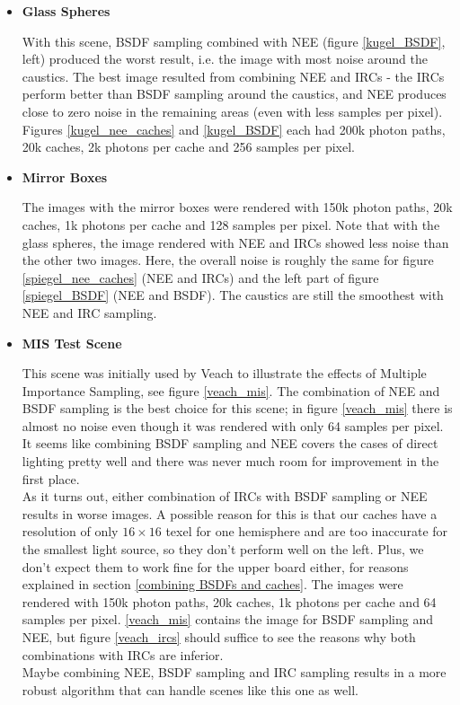 \begin{itemize}
\item \textbf{Glass Spheres}

With this scene, BSDF sampling combined with NEE (figure \ref{kugel_BSDF}, left) produced the worst result, i.e. the image with most noise around the caustics. The best image resulted from combining NEE and IRCs - the IRCs perform better than BSDF sampling around the caustics, and NEE produces close to zero noise in the remaining areas (even with less samples per pixel).\\
Figures \ref{kugel_nee_caches} and \ref{kugel_BSDF} each had 200k photon paths, 20k caches, 2k photons per cache and 256 samples per pixel.

\item \textbf{Mirror Boxes}

The images with the mirror boxes were rendered with 150k photon paths, 20k caches, 1k photons per cache and 128 samples per pixel. Note that with the glass spheres, the image rendered with NEE and IRCs showed less noise than the other two images. Here, the overall noise is roughly the same for figure \ref{spiegel_nee_caches} (NEE and IRCs) and the left part of figure \ref{spiegel_BSDF} (NEE and BSDF). The caustics are still the smoothest with NEE and IRC sampling.

\item \textbf{MIS Test Scene}

This scene was initially used by Veach to illustrate the effects of Multiple Importance Sampling, see figure \ref{veach_mis}. The combination of NEE and BSDF sampling is the best choice for this scene; in figure \ref{veach_mis} there is almost no noise even though it was rendered with only 64 samples per pixel. It seems like combining BSDF sampling and NEE covers the cases of direct lighting pretty well and there was never much room for improvement in the first place.\\
As it turns out, either combination of IRCs with BSDF sampling or NEE results in worse images. A possible reason for this is that our caches have a resolution of only $16 \times 16$ texel for one hemisphere and are too inaccurate for the smallest light source, so they don't perform well on the left. Plus, we don't expect them to work fine for the upper board either, for reasons explained in section \ref{combining BSDFs and caches}.\newline
The images were rendered with 150k photon paths, 20k caches, 1k photons per cache and 64 samples per pixel. \ref{veach_mis} contains the image for BSDF sampling and NEE, but figure \ref{veach_ircs} should suffice to see the reasons why both combinations with IRCs are inferior.\\
Maybe combining NEE, BSDF sampling and IRC sampling results in a more robust algorithm that can handle scenes like this one as well.


\end{itemize}
